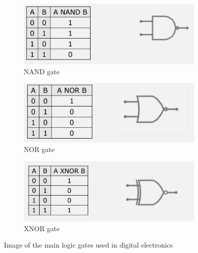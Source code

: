\documentclass{article}
\begin{document}
\begin{figure}[h!]
    \centering
    \begin{subfigure}{.4\textwidth}
        \centering
        \includegraphics[width=\linewidth]{IM_NAND.PNG}
        \caption{NAND gate}
        \label{NAND}
    \end{subfigure}
    \hfill
    \begin{subfigure}{.4\textwidth}
        \centering
        \includegraphics[width=\linewidth]{IM_NOR.PNG}
        \caption{NOR gate}
        \label{NOR}        
    \end{subfigure}
    
    \centering
    \begin{subfigure}{.4\textwidth}
        \centering
        \includegraphics[width=\linewidth]{IM_XNOR.PNG}
        \caption{XNOR gate}
        \label{XNOR}
    \end{subfigure}

\caption{Image of the main logic gates used in digital electronics}
\label{LogicGates}
\end{figure}




\clearpage
\end{document}
